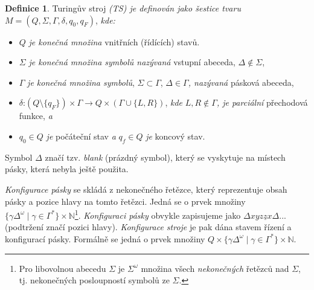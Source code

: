\documentclass[a4paper, twocolumn, 11pt]{article}
\theoremstyle{definition}
\newtheorem{definition}{Definice}
\begin{document}
\noindent
\begin{definition}\label{def:def_1}
Turingův stroj \textit{(TS) je definován jako šestice
tvaru} $M = (Q, \Sigma, \Gamma, \delta, q_0, q_F )$, \textit{kde:} \noindent
\end{definition} \setlength{\parskip}{0em}
\begin{itemize}
\setlength{\parskip}{0.07em}
\item $Q$ \textit{je konečná množina} vnitřních (řídících) stavů.\setlength{\parskip}{0.05em}
\item $\Sigma$ \textit{je konečná množina symbolů nazývaná} vstupní abeceda, $\Delta \notin \Sigma$,
\item $\Gamma$ \textit{je konečná množina symbolů}, $\Sigma \subset \Gamma$, $\Delta \in \Gamma$\textit{, nazývaná} pásková abeceda,
\item $\delta$\;:\;$(Q\setminus\{q_F\}) \times \Gamma \rightarrow Q \times (\Gamma \cup \{L,R\})$, \textit{kde} $L, R \notin \Gamma$\textit{, je parciální} přechodová funkce, \textit{a}
\item $q_0 \in Q$ \textit{je} počáteční stav \textit{a} $q_f \in Q$ \textit{je} koncový stav.
\end{itemize}\setlength{\parskip}{0.1em}

Symbol $\Delta$ značí tzv. \textit{blank} (prázdný symbol), který se
vyskytuje na místech pásky, která nebyla ještě použita.\setlength{\parindent}{1em}

\textit{Konfigurace pásky} se skládá z nekonečného řetězce,
který reprezentuje obsah pásky a pozice hlavy na tomto
řetězci. Jedná se o prvek množiny $\{ \gamma \Delta^\omega \mid \gamma \in \Gamma^* \} \times \mathbb{N}$\footnote{Pro libovolnou abecedu $\Sigma$ je $\Sigma^\omega$ množina všech \textit{nekonečných} řetězců nad $\Sigma$, tj. nekonečných posloupností symbolů ze $\Sigma$.}.
\textit{Konfiguraci pásky} obvykle zapisujeme jako $\Delta xyz\underline{z}x \Delta...$
(podtržení značí pozici hlavy). \textit{Konfigurace stroje} je pak
dána stavem řízení a konfigurací pásky. Formálně se jedná
o prvek množiny $Q \times \{ \gamma \Delta^\omega \mid \gamma \in \Gamma^* \} \times \mathbb{N}$.
\end{document}
